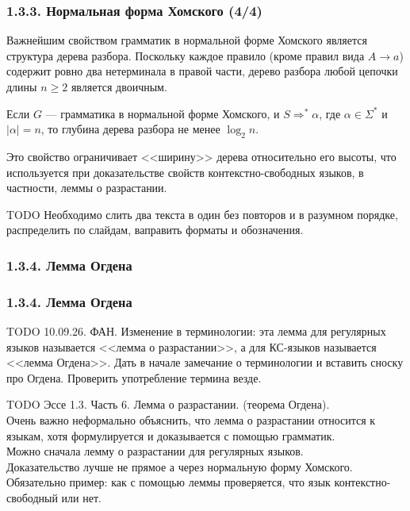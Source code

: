 \documentclass[mathserif,12pt,aspectratio=169]{beamer}
\let\ge\geqslant
\def\TODO#1{{\color{gray} TODO {#1}}}
\begin{document}
\begin{frame}
\frametitle{1.3.3. Нормальная форма Хомского (4/4)}

\begin{remark}
Важнейшим свойством грамматик в нормальной форме Хомского является структура дерева разбора.
Поскольку каждое правило (кроме правил вида $A\to a$) содержит ровно два нетерминала в правой части, дерево разбора любой цепочки длины $n \ge 2$ является двоичным.
\end{remark}

\begin{corollary}
Если $G$ — грамматика в нормальной форме Хомского, и $S \Rightarrow^* \alpha$, где $\alpha \in \Sigma^*$ и $|\alpha|=n$, то глубина дерева разбора не менее $\log_2 n$.
\end{corollary}

Это свойство ограничивает <<ширину>> дерева относительно его высоты,
 что используется при доказательстве свойств контекстно-свободных языков, в частности, леммы о разрастании.
 
 \bigskip
 \TODO{Необходимо слить два текста в один без повторов и в разумном порядке, распределить по слайдам, ваправить форматы и обозначения.}
\end{frame}


\subsubsection{1.3.4. Лемма Огдена}\label{1.3.4.}
\begin{frame}
\frametitle{1.3.4. Лемма Огдена}

\TODO{10.09.26. ФАН. Изменение в терминологии: эта лемма для регулярных языков называется <<лемма о разрастании>>, а для КС-языков называется <<лемма Огдена>>. Дать в начале замечание о терминологии и вставить сноску про Огдена. Проверить употребление термина везде.}



\TODO{Эссе 1.3. Часть 6. Лемма о разрастании. (теорема Огдена). \\
Очень важно неформально объяснить, что лемма о разрастании относится к языкам, хотя формулируется и доказывается с помощью грамматик. \\
Можно сначала лемму о разрастании для регулярных языков.\\
Доказательство лучше не прямое а через нормальную форму Хомского. \\
 Обязательно пример: 
как с помощью леммы проверяется, что язык 
контекстно-свободный или нет.}
\end{frame}
\end{document}
